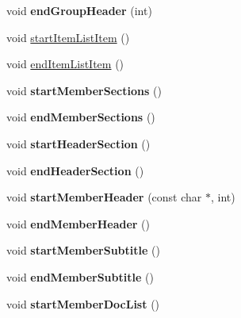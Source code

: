 \begin{DoxyCompactItemize}
void {\bfseries end\+Group\+Header} (int)
\item 
void \mbox{\hyperlink{class_latex_generator_ae7a65542a815c62b5a55283fcc68d774}{start\+Item\+List\+Item}} ()
\item 
void \mbox{\hyperlink{class_latex_generator_a32c196e3b968d56ed445bb3bc090ca6b}{end\+Item\+List\+Item}} ()
\item 
\mbox{\label{class_latex_generator_a23972d083807cc9cb2c16c599724d3d1}} 
void {\bfseries start\+Member\+Sections} ()
\item 
\mbox{\label{class_latex_generator_a11bd307d045459052bcc3e096bf4ecd5}} 
void {\bfseries end\+Member\+Sections} ()
\item 
\mbox{\label{class_latex_generator_a5e472c9aacb7d71ac64c6d6c71fdf1a0}} 
void {\bfseries start\+Header\+Section} ()
\item 
\mbox{\label{class_latex_generator_ac28872ad91e4d83b68a7a948b341c0d6}} 
void {\bfseries end\+Header\+Section} ()
\item 
\mbox{\label{class_latex_generator_a69f60a23de716f5d00b3198e77016e76}} 
void {\bfseries start\+Member\+Header} (const char $\ast$, int)
\item 
\mbox{\label{class_latex_generator_aab0f11e3d9ce4eec99f4c9253e90d42c}} 
void {\bfseries end\+Member\+Header} ()
\item 
\mbox{\label{class_latex_generator_a0fbe7f7867a9ba49681196d415c37a1a}} 
void {\bfseries start\+Member\+Subtitle} ()
\item 
\mbox{\label{class_latex_generator_a1df0ae4d268f904add9bbfc67ee31797}} 
void {\bfseries end\+Member\+Subtitle} ()
\item 
\mbox{\label{class_latex_generator_acc1d5f45c86faebbfa1e193aa6a9724a}} 
void {\bfseries start\+Member\+Doc\+List} ()
\item 
\mbox{\label{class_latex_generator_a6e886d2519d4bfeff8d4023713ff59e5}} 

\end{DoxyCompactItemize}
